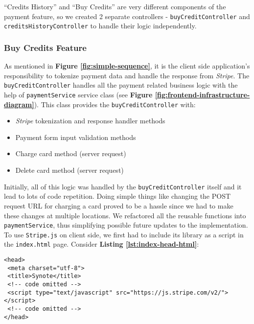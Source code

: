 “Credits History” and “Buy Credits” are very different components of the payment feature, so we created 2 separate controllers - \texttt{buyCreditController} and \texttt{creditsHistoryController} to handle their logic independently.

\subsubsection{Buy Credits Feature}
\label{subsubsec:buy-credits-feature}

As mentioned in \textbf{Figure \ref{fig:simple-sequence}}, it is the client side application's responsibility to tokenize payment data and handle the response from \textit{Stripe}. The \texttt{buyCreditController} handles all the payment related business logic with the help of \texttt{paymentService} service class (see \textbf{Figure \ref{fig:frontend-infrastructure-diagram}}). This class provides the \texttt{buyCreditController} with:

\begin{itemize}
\item \textit{Stripe} tokenization and response handler methods
\item Payment form input validation methods
\item Charge card method (server request)
\item Delete card method (server request)
\end{itemize}

Initially, all of this logic was handled by the \texttt{buyCreditController} itself and it lead to lots of code repetition. Doing simple things like changing the POST request URL for charging a card proved to be a hassle since we had to make these changes at multiple locations. We refactored all the reusable functions into \texttt{paymentService}, thus simplifying possible future updates to the implementation. \\

To use \texttt{Stripe.js} on client side, we first had to include its library as a script in the \texttt{index.html} page. Consider \textbf{Listing \ref{lst:index-head-html}}:\\

\begin{listing}[H]
\begin{verbatim}
<head>
 <meta charset="utf-8">
 <title>Synote</title>
 <!-- code omitted -->
 <script type="text/javascript" src="https://js.stripe.com/v2/"></script>
 <!-- code omitted -->
</head>
\end{verbatim}
\label{lst:index-head-html}
\end{listing}

